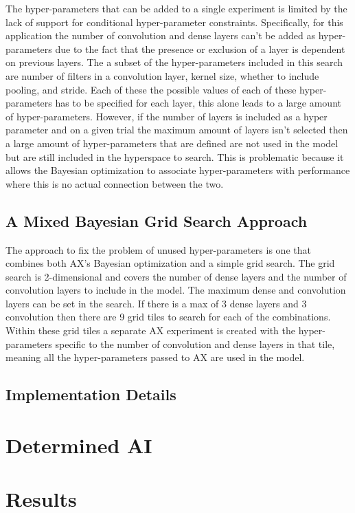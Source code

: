 \documentclass{article}
\begin{document}
The hyper-parameters that can be added to a single experiment is limited by the lack of support for conditional hyper-parameter constraints. Specifically, for this application the number of convolution and dense layers can't be added as hyper-parameters due to the fact that the presence or exclusion of a layer is dependent on previous layers. The a subset of the hyper-parameters included in this search are number of filters in a convolution layer, kernel size, whether to include pooling, and stride. Each of these the possible values of each of these hyper-parameters has to be specified for each layer, this alone leads to a large amount of hyper-parameters. However, if the number of layers is included as a hyper parameter and on a given trial the maximum amount of layers isn't selected then a large amount of hyper-parameters that are defined are not used in the model but are still included in the hyperspace to search. This is problematic because it allows the Bayesian optimization to associate hyper-parameters with performance where this is no actual connection between the two. 

\subsection{A Mixed Bayesian Grid Search Approach}

The approach to fix the problem of unused hyper-parameters is one that combines both AX's Bayesian optimization and a simple grid search. The grid search is 2-dimensional and covers the number of dense layers and the number of convolution layers to include in the model. The maximum dense and convolution layers can be set in the search. If there is a max of 3 dense layers and 3 convolution then there are 9 grid tiles to search for each of the combinations. Within these grid tiles a separate AX experiment is created with the hyper-parameters specific to the number of convolution and dense layers in that tile, meaning all the hyper-parameters passed to AX are used in the model. 

\subsection{Implementation Details}
\section{Determined AI}

\section{Results}
\end{document}
